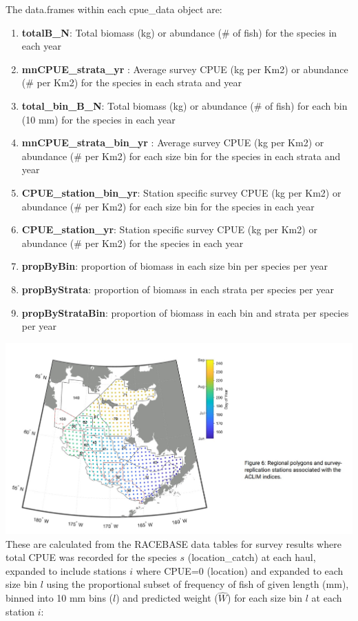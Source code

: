 \documentclass[
]{article}
\providecommand{\tightlist}{%
  \setlength{\itemsep}{0pt}\setlength{\parskip}{0pt}}
\begin{document}
The data.frames within each cpue\_data object are:

\begin{enumerate}
\def\labelenumi{\arabic{enumi}.}
\tightlist
\item
  \textbf{totalB\_N}: Total biomass (kg) or abundance (\# of fish) for
  the species in each year\\
\item
  \textbf{mnCPUE\_strata\_yr} : Average survey CPUE (kg per Km2) or
  abundance (\# per Km2) for the species in each strata and year\\
\item
  \textbf{total\_bin\_B\_N}: Total biomass (kg) or abundance (\# of
  fish) for each bin (10 mm) for the species in each year\\
\item
  \textbf{mnCPUE\_strata\_bin\_yr} : Average survey CPUE (kg per Km2) or
  abundance (\# per Km2) for each size bin for the species in each
  strata and year
\item
  \textbf{CPUE\_station\_bin\_yr}: Station specific survey CPUE (kg per
  Km2) or abundance (\# per Km2) for each size bin for the species in
  each year\\
\item
  \textbf{CPUE\_station\_yr}: Station specific survey CPUE (kg per Km2)
  or abundance (\# per Km2) for the species in each year\\
\item
  \textbf{propByBin}: proportion of biomass in each size bin per species
  per year\\
\item
  \textbf{propByStrata}: proportion of biomass in each strata per
  species per year
\item
  \textbf{propByStrataBin}: proportion of biomass in each bin and strata
  per species per year
\end{enumerate}

\includegraphics{figs/Kearney_2023.jpg} These are calculated from the
RACEBASE data tables for survey results where total CPUE was recorded
for the species \(s\) (location\_catch) at each haul, expanded to
include stations \(i\) where CPUE=0 (location) and expanded to each size
bin \(l\) using the proportional subset of frequency of fish of given
length (mm), binned into 10 mm bins (\(l\)) and predicted weight
(\(\hat{W}\)) for each size bin \(l\) at each station \(i\):
\end{document}
